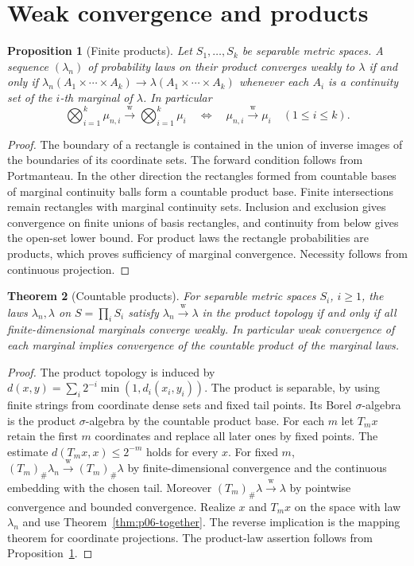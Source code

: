 \documentclass[11pt,oneside,openany]{book}
\newcommand{\weakto}{\xrightarrow{\mathrm{w}}}
\theoremstyle{plain}
\newtheorem{theorem}{Theorem}[chapter]
\newtheorem{proposition}[theorem]{Proposition}
\theoremstyle{definition}
\theoremstyle{remark}
\begin{document}
\section{Weak convergence and products}
\label{p06-08}

\begin{proposition}[Finite products]
\label{prop:p06-finite-products}
Let \(S_1,\dots,S_k\) be separable metric spaces. A sequence
\((\lambda_n)\) of probability laws on their product converges
weakly to \(\lambda\) if and only if \(\lambda_n(A_1\times
\cdots\times A_k)\to\lambda(A_1\times\cdots\times A_k)\) whenever
each \(A_i\) is a continuity set of the \(i\)-th marginal of
\(\lambda\). In particular
\[
 \bigotimes_{i=1}^k\mu_{n,i}\weakto\bigotimes_{i=1}^k\mu_i
 \quad\Longleftrightarrow\quad
 \mu_{n,i}\weakto\mu_i\quad(1\leq i\leq k).
\]
\end{proposition}

\begin{proof}
The boundary of a rectangle is contained in the union of inverse
images of the boundaries of its coordinate sets. The forward
condition follows from Portmanteau. In the other direction the
rectangles formed from countable bases of marginal continuity
balls form a countable product base. Finite intersections remain
rectangles with marginal continuity sets. Inclusion and exclusion
gives convergence on finite unions of basis rectangles, and
continuity from below gives the open-set lower bound. For product
laws the rectangle probabilities are products, which proves
sufficiency of marginal convergence. Necessity follows from
continuous projection.
\end{proof}

\begin{theorem}[Countable products]
\label{thm:p06-countable-products}
For separable metric spaces \(S_i\), \(i\geq1\), the laws
\(\lambda_n,\lambda\) on \(S=\prod_i S_i\) satisfy
\(\lambda_n\weakto\lambda\) in the product topology if and only
if all finite-dimensional marginals converge weakly. In particular
weak convergence of each marginal implies convergence of the
countable product of the marginal laws.
\end{theorem}

\begin{proof}
The product topology is induced by
\(d(x,y)=\sum_i2^{-i}\min(1,d_i(x_i,y_i))\). The product is separable,
by using finite strings from coordinate dense sets and fixed tail
points. Its Borel \(\sigma\)-algebra is the product
\(\sigma\)-algebra by the countable product base. For each \(m\)
let \(T_m x\) retain the first \(m\) coordinates and replace all
later ones by fixed points. The estimate \(d(T_mx,x)\leq2^{-m}\)
holds for every \(x\). For fixed \(m\),
\((T_m)_\#\lambda_n\weakto (T_m)_\#\lambda\) by finite-dimensional
convergence and the continuous embedding with the chosen tail.
Moreover \((T_m)_\#\lambda\weakto\lambda\) by pointwise
convergence and bounded convergence. Realize \(x\) and \(T_mx\)
on the space with law \(\lambda_n\) and use
Theorem~\ref{thm:p06-together}. The reverse implication is the
mapping theorem for coordinate projections. The product-law
assertion follows from Proposition~\ref{prop:p06-finite-products}.
\end{proof}
\end{document}
